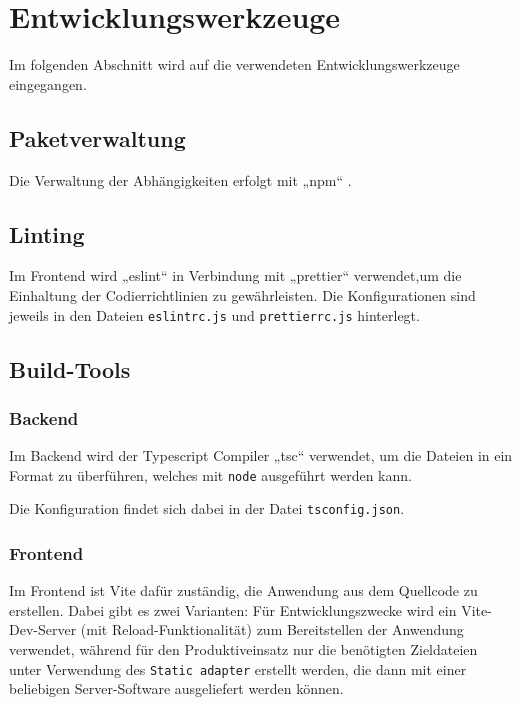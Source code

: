 \documentclass[a4paper, 10pt, conference]{IEEEtran}
\begin{document}
\section{Entwicklungswerkzeuge} \label{s:entwicklungswerkzeuge}

Im folgenden Abschnitt wird auf die verwendeten Entwicklungswerkzeuge eingegangen.

\subsection{Paketverwaltung}

Die Verwaltung der Abhängigkeiten erfolgt mit „npm“ \cite{npm}.

\subsection{Linting}

Im Frontend wird „eslint“ in Verbindung mit „prettier“ verwendet,um die Einhaltung der Codierrichtlinien zu gewährleisten.
Die Konfigurationen sind jeweils in den Dateien \texttt{eslintrc.js} und \texttt{prettierrc.js} hinterlegt.

\subsection{Build-Tools}

\subsubsection{Backend}

Im Backend wird der Typescript Compiler „tsc“ verwendet, um die Dateien in ein Format zu überführen,
welches mit \texttt{node} ausgeführt werden kann.

Die Konfiguration findet sich dabei in der Datei \texttt{tsconfig.json}.

\subsubsection{Frontend}
Im Frontend ist Vite dafür zuständig, die Anwendung aus dem Quellcode zu erstellen. Dabei gibt es zwei Varianten:
Für Entwicklungszwecke wird ein Vite-Dev-Server (mit Reload-Funktionalität) zum Bereitstellen der Anwendung verwendet,
während für den Produktiveinsatz nur die benötigten Zieldateien unter Verwendung des \texttt{Static adapter} erstellt werden, die dann mit einer beliebigen Server-Software ausgeliefert werden können.
\end{document}
